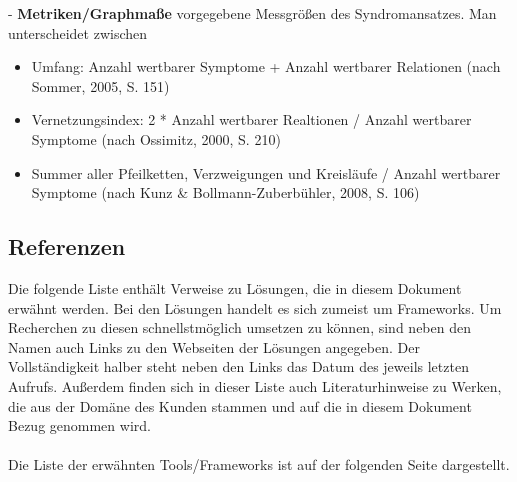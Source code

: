 \documentclass[enabledeprecatedfontcommands,fontsize=11pt,paper=a4,twoside]{scrartcl}
\newcounter{one}
\begin{document}
- \textbf{\hypertarget{Metriken}{Metriken/Graphmaße}} vorgegebene Messgrößen des Syndromansatzes. Man unterscheidet zwischen
\begin{itemize}
\item Umfang: Anzahl wertbarer Symptome + Anzahl wertbarer Relationen (nach Sommer, 2005, S. 151)
\item Vernetzungsindex: 2 * Anzahl wertbarer Realtionen / Anzahl wertbarer Symptome (nach Ossimitz, 2000, S. 210)
\item Summer aller Pfeilketten, Verzweigungen und Kreisläufe / Anzahl wertbarer Symptome (nach Kunz \& Bollmann-Zuberbühler, 2008, S. 106)
\end{itemize}

\newpage
\subsection{Referenzen} 
Die folgende Liste enthält Verweise zu Lösungen, die in diesem Dokument erwähnt werden. Bei den Lösungen handelt es sich zumeist um Frameworks. Um Recherchen zu diesen schnellstmöglich umsetzen zu können, sind neben den Namen auch Links zu den Webseiten der Lösungen angegeben. Der Vollständigkeit halber steht neben den Links das Datum des jeweils letzten Aufrufs. Außerdem finden sich in dieser Liste auch Literaturhinweise zu Werken, die aus der Domäne des Kunden stammen und auf die in diesem Dokument Bezug genommen wird. \\ \\
Die Liste der erwähnten Tools/Frameworks ist auf der folgenden Seite dargestellt. \\
\newpage
\end{document}
